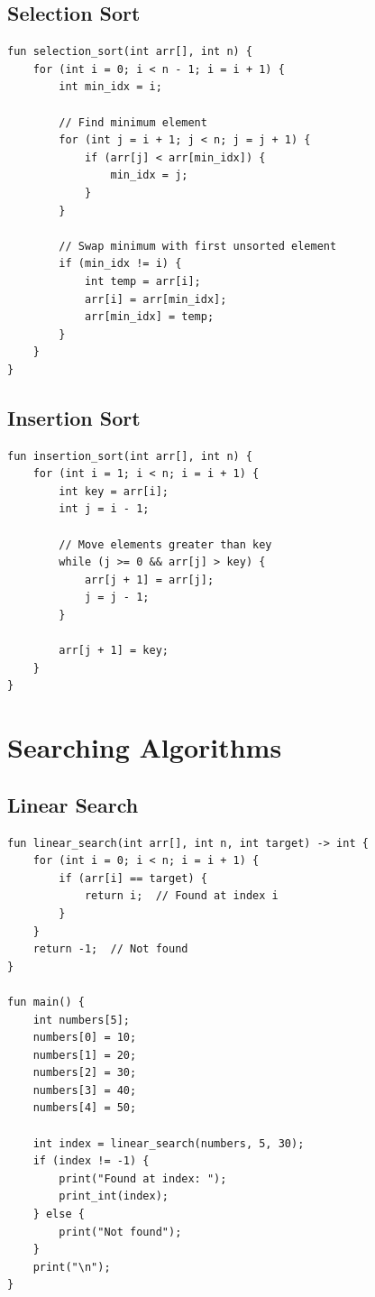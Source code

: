 \documentclass[12pt,a4paper,oneside]{book}
\begin{document}
\subsection{Selection Sort}

\begin{lstlisting}[style=algo, caption={Selection Sort}]
fun selection_sort(int arr[], int n) {
    for (int i = 0; i < n - 1; i = i + 1) {
        int min_idx = i;
        
        // Find minimum element
        for (int j = i + 1; j < n; j = j + 1) {
            if (arr[j] < arr[min_idx]) {
                min_idx = j;
            }
        }
        
        // Swap minimum with first unsorted element
        if (min_idx != i) {
            int temp = arr[i];
            arr[i] = arr[min_idx];
            arr[min_idx] = temp;
        }
    }
}
\end{lstlisting}

\subsection{Insertion Sort}

\begin{lstlisting}[style=algo, caption={Insertion Sort}]
fun insertion_sort(int arr[], int n) {
    for (int i = 1; i < n; i = i + 1) {
        int key = arr[i];
        int j = i - 1;
        
        // Move elements greater than key
        while (j >= 0 && arr[j] > key) {
            arr[j + 1] = arr[j];
            j = j - 1;
        }
        
        arr[j + 1] = key;
    }
}
\end{lstlisting}

\section{Searching Algorithms}

\subsection{Linear Search}

\begin{lstlisting}[style=algo, caption={Linear Search}]
fun linear_search(int arr[], int n, int target) -> int {
    for (int i = 0; i < n; i = i + 1) {
        if (arr[i] == target) {
            return i;  // Found at index i
        }
    }
    return -1;  // Not found
}

fun main() {
    int numbers[5];
    numbers[0] = 10;
    numbers[1] = 20;
    numbers[2] = 30;
    numbers[3] = 40;
    numbers[4] = 50;
    
    int index = linear_search(numbers, 5, 30);
    if (index != -1) {
        print("Found at index: ");
        print_int(index);
    } else {
        print("Not found");
    }
    print("\n");
}
\end{lstlisting}
\end{document}

